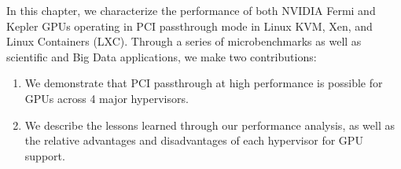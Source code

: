 
In this chapter, we characterize the performance of both NVIDIA Fermi and Kepler GPUs
operating in PCI passthrough mode in Linux KVM, Xen, and Linux
Containers (LXC).  Through a series of microbenchmarks as well as scientific and
Big Data applications, we make two contributions: 

\begin{enumerate}
\item We demonstrate that PCI passthrough at high performance is possible for
GPUs across 4 major hypervisors.
\item We describe the lessons learned through our performance analysis, as well as the relative advantages
and disadvantages of each hypervisor for GPU support.
\end{enumerate}








